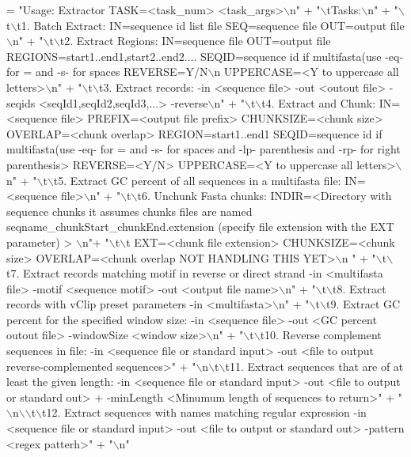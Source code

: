 \begin{DoxyCode}
= \textcolor{stringliteral}{"Usage: Extractor TASK=<task\_num> <task\_args>\(\backslash\)n"} +
    \textcolor{stringliteral}{"\(\backslash\)tTasks:\(\backslash\)n"} +
    \textcolor{stringliteral}{"\(\backslash\)t\(\backslash\)t1. Batch Extract: IN=sequence id list file SEQ=sequence file OUT=output file\(\backslash\)n"} +
    \textcolor{stringliteral}{"\(\backslash\)t\(\backslash\)t2. Extract Regions: IN=sequence file OUT=output file REGIONS=start1..end1,start2..end2....
       SEQID=sequence id if multifasta(use -eq- for = and -s- for spaces REVERSE=Y/N\(\backslash\)n UPPERCASE=<Y to uppercase all
       letters>\(\backslash\)n"} +
    \textcolor{stringliteral}{"\(\backslash\)t\(\backslash\)t3. Extract records: -in <sequence file> -out <outout file> -seqids <seqId1,seqId2,seqId3,...>
       -reverse\(\backslash\)n"} +
    \textcolor{stringliteral}{"\(\backslash\)t\(\backslash\)t4. Extract and Chunk: IN=<sequence file> PREFIX=<output file prefix> CHUNKSIZE=<chunk size>
       OVERLAP=<chunk overlap> REGION=start1..end1 SEQID=sequence id if multifasta(use -eq- for = and -s- for spaces and
       -lp- parenthesis and -rp- for right parenthesis> REVERSE=<Y/N> UPPERCASE=<Y to uppercase all letters>\(\backslash\)n"} +
    \textcolor{stringliteral}{"\(\backslash\)t\(\backslash\)t5. Extract GC percent of all sequences in a multifasta file: IN=<sequence file>\(\backslash\)n"} +
    \textcolor{stringliteral}{"\(\backslash\)t\(\backslash\)t6. Unchunk Fasta chunks: INDIR=<Directory with sequence chunks it assumes chunks files are named
       seqname\_chunkStart\_chunkEnd.extension (specify file extension with the EXT parameter) > \(\backslash\)n"}+
    \textcolor{stringliteral}{"\(\backslash\)t\(\backslash\)t EXT=<chunk file extension> CHUNKSIZE=<chunk size> OVERLAP=<chunk overlap NOT HANDLING THIS YET>\(\backslash\)n
      "} +
    \textcolor{stringliteral}{"\(\backslash\)t\(\backslash\)t7. Extract records matching motif in reverse or direct strand -in <multifasta file> -motif
       <sequence motif> -out <output file name>\(\backslash\)n"} +
    \textcolor{stringliteral}{"\(\backslash\)t\(\backslash\)t8. Extract records with vClip preset parameters -in <multifasta>\(\backslash\)n"} +
    \textcolor{stringliteral}{"\(\backslash\)t\(\backslash\)t9. Extract GC percent for the specified window size: -in <sequence file> -out <GC percent outout
       file> -windowSize <window size>\(\backslash\)n"} +
    \textcolor{stringliteral}{"\(\backslash\)t\(\backslash\)t10. Reverse complement sequences in file: -in <sequence file or standard input> -out <file to
       output reverse-complemented sequences>"} +
    \textcolor{stringliteral}{"\(\backslash\)n\(\backslash\)t\(\backslash\)t11. Extract sequences that are of at least the given length: -in <sequence file or standard
       input> -out <file to output or standard out> + -minLength <Minumum length of sequences to return>"} +
    \textcolor{stringliteral}{"\(\backslash\)n\(\backslash\)\(\backslash\)t\(\backslash\)t12. Extract sequences with names matching regular expression -in <sequence file or standard
       input> -out <file to output or standard out> -pattern <regex patterh>"} +
    \textcolor{stringliteral}{"\(\backslash\)n"}
\end{DoxyCode}


